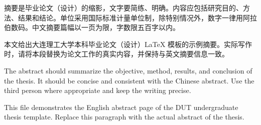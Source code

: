 
\begin{cnabstract}
摘要是毕业论文（设计）的缩影，文字要简练、明确。内容应包括研究目的、方法、结果和结论。单位采用国际标准计量单位制，除特别情况外，数字一律用阿拉伯数码。中文摘要篇幅以一页为限，字数限五百字以内。

本文给出大连理工大学本科毕业论文（设计）LaTeX 模板的示例摘要。实际写作时，请将本段替换为论文工作的真实内容，并保持与英文摘要信息一致。

\end{cnabstract}

\begin{enabstract}
The abstract should summarize the objective, method, results, and conclusion of the thesis. It should be concise and consistent with the Chinese abstract. Use the third person where appropriate and keep the writing precise.

This file demonstrates the English abstract page of the DUT undergraduate thesis template. Replace this paragraph with the actual abstract of the thesis.

\end{enabstract}
